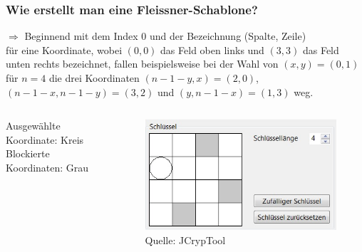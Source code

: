 \documentclass{beamer}
\begin{document}
\begin{frame}
\frametitle{Wie erstellt man eine Fleissner-Schablone?} 
\vspace{0.2cm}
$\Rightarrow$ Beginnend mit dem Index $0$ und der Bezeichnung (Spalte, Zeile)\\ für eine Koordinate, wobei $(0,0)$ das Feld oben links und $(3,3)$ das Feld unten rechts bezeichnet, fallen beispielsweise bei der Wahl von $(x,y)=(0,1)$ für $n=4$ die drei Koordinaten $(n-1-y,x)=(2,0)$, $(n-1-x,n-1-y)=(3,2)$ und $(y,n-1-x)=(1,3)$ weg.%

\begin{columns}
\begin{column}{5cm}
Ausgewählte Koordinate: Kreis\\
Blockierte Koordinaten: Grau
\vspace{2cm}
\end{column}
\begin{column}{4.5cm}
\begin{figure}
\includegraphics[scale=0.5]{firstHole.jpg}
\caption{\small Quelle: JCrypTool}
\end{figure}
\vspace{2cm}
\end{column}
\end{columns}
\end{frame}
\end{document}
